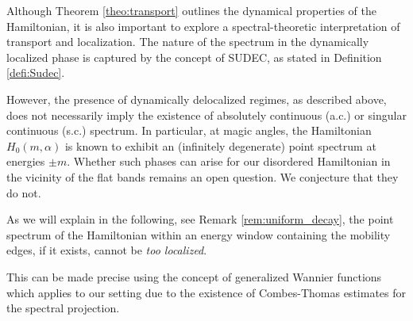 \documentclass[reqno,12pt,letterpaper]{amsart}
\numberwithin{equation}{section}
\begin{document}
Although Theorem \ref{theo:transport} outlines the dynamical properties of the Hamiltonian, it is also important to explore a spectral-theoretic interpretation of transport and localization. The nature of the spectrum in the dynamically localized phase is captured by the concept of SUDEC, as stated in Definition \ref{defi:Sudec}. 

However, the presence of dynamically delocalized regimes, as described above, does not necessarily imply the existence of absolutely continuous (a.c.) or singular continuous (s.c.) spectrum. In particular, at magic angles, the Hamiltonian $H_0(m,\alpha)$ is known to exhibit an (infinitely degenerate) point spectrum at energies $\pm m$. Whether such phases can arise for our disordered Hamiltonian in the vicinity of the flat bands remains an open question. We conjecture that they do not.

As we will explain in the following, see Remark \ref{rem:uniform_decay}, the point spectrum of the Hamiltonian within an energy window containing the mobility edges, if it exists, cannot be \emph{too localized}. 

This can be made precise using the concept of generalized Wannier functions \cite{CMM19,MMP, LS21} { which applies to our setting due to the existence of Combes-Thomas estimates for the spectral projection.}
\end{document}
